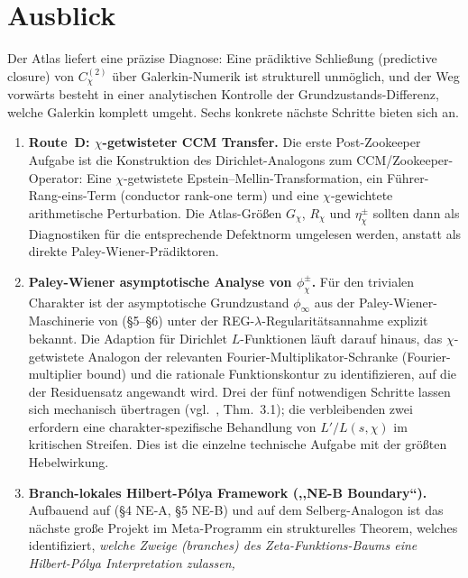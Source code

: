 \documentclass[10pt,twocolumn]{article}
\theoremstyle{definition}
\theoremstyle{remark}
\newcommand{\chifn}{\chi}
\begin{document}
\section{Ausblick}
\label{sec:outlook}

Der Atlas liefert eine präzise Diagnose: Eine prädiktive Schließung (predictive closure) von
$C^{(2)}_{\chifn}$ über Galerkin-Numerik ist strukturell
unmöglich, und der Weg vorwärts besteht in einer analytischen Kontrolle der
Grundzustands-Differenz, welche Galerkin komplett umgeht. Sechs
konkrete nächste Schritte bieten sich an.

\begin{enumerate}
  \item \textbf{Route~D: $\chifn$-getwisteter CCM Transfer.}
    Die erste Post-Zookeeper Aufgabe ist die Konstruktion des Dirichlet-Analogons
    zum CCM/Zookeeper-Operator: Eine $\chifn$-getwistete
    Epstein--Mellin-Transformation, ein Führer-Rang-eins-Term (conductor rank-one term) und eine
    $\chifn$-gewichtete arithmetische Perturbation. Die Atlas-Größen
    $G_{\chifn}$, $R_{\chifn}$ und $\eta^\pm_{\chifn}$ sollten dann
    als Diagnostiken für die entsprechende Defektnorm umgelesen werden,
    anstatt als direkte Paley-Wiener-Prädiktoren.
  \item \textbf{Paley-Wiener asymptotische Analyse von
    $\phi^\pm_{\chifn}$.}
    Für den trivialen Charakter ist der asymptotische Grundzustand
    $\phi_\infty$ aus der Paley-Wiener-Maschinerie von \cite{RH_II} (\S5--\S6)
    unter der REG-$\lambda$-Regularitätsannahme explizit bekannt.
    Die Adaption für Dirichlet $L$-Funktionen läuft darauf hinaus, das
    $\chifn$-getwistete Analogon der relevanten Fourier-Multiplikator-Schranke (Fourier-multiplier bound)
    und die rationale Funktionskontur zu identifizieren, auf die der
    Residuensatz angewandt wird. Drei der fünf notwendigen Schritte
    lassen sich mechanisch übertragen (vgl.\ \cite{AnalyticGroundstate},
    Thm.~3.1); die verbleibenden zwei erfordern eine charakter-spezifische
    Behandlung von $L'/L(s,\chifn)$ im kritischen Streifen. Dies ist
    die einzelne technische Aufgabe mit der größten Hebelwirkung.
  \item \textbf{Branch-lokales Hilbert-P\'olya Framework (,,NE-B
    Boundary``).}
    Aufbauend auf \cite{RH_II} (\S4 NE-A, \S5 NE-B) und auf dem
    Selberg-Analogon ist das nächste große Projekt im Meta-Programm
    ein strukturelles Theorem, welches identifiziert, \emph{welche Zweige (branches) des
    Zeta-Funktions-Baums eine Hilbert-P\'olya Interpretation zulassen,
}
\end{enumerate}
\end{document}
